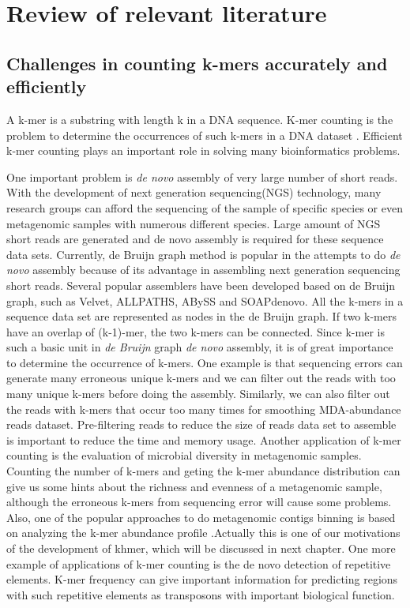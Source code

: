 \chapter{Review of relevant literature}


\section{Challenges in counting k-mers accurately and efficiently}

A k-mer is a substring with length k in a DNA sequence. K-mer counting is the
problem to determine the occurrences of such k-mers in a DNA dataset 
\cite{Marcais2011}. Efficient k-mer counting plays an important role in solving many
bioinformatics problems. 

One important problem is \textit{de novo} assembly of very large number of short reads.
With the development of next generation sequencing(NGS) technology, many research
groups can afford the sequencing of the sample of specific species or even
metagenomic samples with numerous different species\cite{pubmed19997069}. 
Large amount of NGS short reads are generated and de novo assembly is
required for these sequence data sets\cite{pubmed20211242}. Currently, de Bruijn graph method is
popular in the attempts to do \textit{de novo} assembly because of its advantage in
assembling next generation sequencing short reads\cite{Pevzner2001}. Several
popular assemblers have been developed based on de Bruijn graph, such as
Velvet\cite{Zerbino2008}, ALLPATHS\cite{Butler2008}, ABySS\cite{Simpson2009}
and SOAPdenovo\cite{Li2010}. All the k-mers in a sequence
data set are represented as nodes in the de Bruijn graph. If
two k-mers have an overlap of (k-1)-mer, the two k-mers can be connected. Since
k-mer is such a basic unit in \textit{de Bruijn} graph \textit{de novo}
assembly, it is of
great importance to determine the occurrence of k-mers. One example is that
sequencing errors can generate many erroneous unique k-mers and we can filter
out the reads with too many unique k-mers before doing the assembly. Similarly,
we can also filter out the reads with k-mers that occur too many times for
smoothing MDA-abundance reads dataset. Pre-filtering reads to reduce the size
of reads data set to assemble is important to reduce the time and memory usage.
Another application of k-mer counting is the evaluation of microbial diversity
in metagenomic samples. Counting the number of k-mers and geting the k-mer
abundance distribution can give us some hints about the richness and evenness
of a metagenomic sample, although the erroneous k-mers from sequencing error
will cause some problems. Also, one of the popular approaches to do metagenomic
contigs binning is based on analyzing the k-mer abundance profile 
\cite{Patil:2012aa} \cite{Brady:2011aa}\cite{Rosen:2011aa}.Actually this is 
one of our motivations of the development of khmer, which
will be discussed in next chapter. One more example of applications of 
k-mer counting is the de novo detection of repetitive
elements. K-mer frequency can give important information for predicting regions
with  such repetitive elements as transposons with important biological
function.\cite{Kurtz2008}


